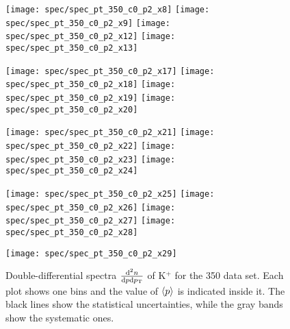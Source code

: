 \begin{figure}[!ht]
  \centering

  \texttt{[image: spec/spec\_pt\_350\_c0\_p2\_x8]}
  \texttt{[image: spec/spec\_pt\_350\_c0\_p2\_x9]}
  \texttt{[image: spec/spec\_pt\_350\_c0\_p2\_x12]}
  \texttt{[image: spec/spec\_pt\_350\_c0\_p2\_x13]}

  \texttt{[image: spec/spec\_pt\_350\_c0\_p2\_x17]}
  \texttt{[image: spec/spec\_pt\_350\_c0\_p2\_x18]}
  \texttt{[image: spec/spec\_pt\_350\_c0\_p2\_x19]}
  \texttt{[image: spec/spec\_pt\_350\_c0\_p2\_x20]}

  \texttt{[image: spec/spec\_pt\_350\_c0\_p2\_x21]}
  \texttt{[image: spec/spec\_pt\_350\_c0\_p2\_x22]}
  \texttt{[image: spec/spec\_pt\_350\_c0\_p2\_x23]}
  \texttt{[image: spec/spec\_pt\_350\_c0\_p2\_x24]}

  \texttt{[image: spec/spec\_pt\_350\_c0\_p2\_x25]}
  \texttt{[image: spec/spec\_pt\_350\_c0\_p2\_x26]}
  \texttt{[image: spec/spec\_pt\_350\_c0\_p2\_x27]}
  \texttt{[image: spec/spec\_pt\_350\_c0\_p2\_x28]}

  \texttt{[image: spec/spec\_pt\_350\_c0\_p2\_x29]}
 
  \caption{Double-differential spectra $\frac{\text{d}^2n}{\text{d}p\text{d}p_\text{T}}$
    of K$^+$ for the 350 \GeVc data set. Each plot shows one \pp bins and the value
    of $\langle p\rangle$ is indicated inside it. The black lines show the statistical
    uncertainties, while the gray bands show the systematic ones.}
  \label{fig:hadron:spec:dedx:all350:c0p2}
\end{figure}


